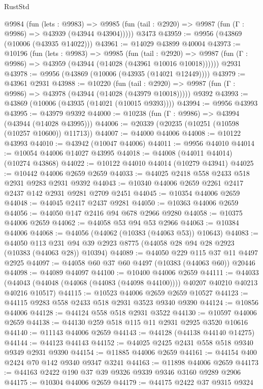 \begin{lexlean}{RustStd}
\begin{coremodule}
    @9984
      (fun (lets : @9983) =>
      @9985 (fun (tail : @2920) => @9987 (fun (Γ : @9986) => @43939 (@43944 @43904)))))
    @3473
@43959 := @9956 (@43869 (@10006 (@43935 @14022)))
@43961 := @14029 @43899 @40004
@43973 := @10196
    (fun (lets : @9983) =>
    @9985
      (fun (tail : @2920) =>
      @9987 (fun (Γ : @9986) => @43959 (@43944 (@14028 (@43961 @10016 @10018))))))
    @2931
@43978 := @9956 (@43869 (@10006 (@43935 (@14021 @12449))))
@43979 := @43961 @2931
@43988 := @10220
    (fun (tail : @2920) => @9987 (fun (Γ : @9986) => @43978 (@43944 (@14028 (@43979 @10018)))))
    @9392
@43993 := @43869 (@10006 (@43935 (@14021 (@10015 @9393))))
@43994 := @9956 @43993
@43995 := @43979 @9392
@44000 := @10238 (fun (Γ : @9986) => @43994 (@43944 (@14028 @43995)))
@44006 := @20339 (@20235 (@10251 (@10598 (@10257 @10600)) @11713))
@44007 := @44000 @44006
@44008 := @10122 @43993
@44010 := @43942 (@10047 @44006)
@44011 := @9956 @44010
@44014 := @10054 @44006 @14027 @43995
@44018 := @44008 (@44011 @44014) (@10274 @43868)
@44022 := @10122 @44010 @44014 (@10279 @43941)
@44025 := @10442 @44006 @2659 @2659
@44033 := @44025 @2418 @558 @2433 @518 @2931 @9283 @2931 @9392
@44043 := @10340 @44006 @2659 @2261 @2417 @2437 @142 @2931 @9281 @2709 @2451
@44045 := @10354 @44006 @2659
@44048 := @44045 @2417 @2437 @9281
@44050 := @10363 @44006 @2659
@44056 := @44050 @147 @2416 @94 @678 @2966 @9280
@44058 := @10375 @44006 @2659
@44062 := @44058 @53 @94 @53 @2966
@44063 := @10384 @44006
@44068 := @44056 (@44062 (@10383 (@44063 @53)) @10643)
@44083 := @44050
    @113
    @231
    @94
    @39
    @2923
    @8775
    (@44058 @28 @94 @28 @2923 (@10383 (@44063 @28)) @10394)
@44089 := @44050 @229 @115 @37 @11 @4497 @2925
@44097 := @44058 @60 @37 @60 @4497 (@10383 (@44063 @60)) @20446
@44098 := @44089 @44097
@44100 := @10400 @44006 @2659
@44111 := @44033
    (@44043 (@44048 (@44068 (@44083 (@44098 @44100)))) @40207 @40210 @40213 @40216 @10517)
@44115 := @10523 @44006 @2659 @2659 @10527
@44123 := @44115 @9283 @558 @2433 @518 @2931 @3523 @9340 @9390
@44124 := @10856 @44006
@44128 := @44124 @558 @518 @2931 @3522
@44130 := @10597 @44006 @2659
@44138 := @44130 @259 @518 @115 @11 @2931 @2925 @3520 @10616
@44140 := @11143 @44006 @2659
@44143 := @44128 (@44138 @44140 @14275)
@44144 := @44123 @44143
@44152 := @44025 @2425 @2431 @558 @518 @9340 @9349 @2931 @9390
@44154 := @11885 @44006 @2659
@44161 := @44154 @400 @2424 @70 @142 @9340 @9347 @3241
@44163 := @11898 @44006 @2659
@44173 := @44163 @2422 @190 @37 @39 @9326 @9339 @9346 @3160 @9289 @2906
@44175 := @10304 @44006 @2659
@44179 := @44175 @2422 @37 @9315 @9324

\end{coremodule}
\end{lexlean}
